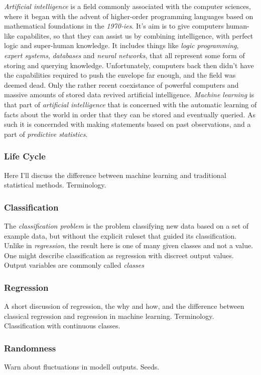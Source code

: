 \documentclass[a4paper,man,12pt,apacite]{apa6} %
\begin{document}
\emph{Artificial intelligence} is a field commonly associated with the
computer sciences, where it began with the advent of higher-order
programming languages based on mathematical foundations in the \emph{1970-ies}.
It's aim is to give computers human-like capabilites, so that they can assist
us by combining intelligence, with perfect logic and super-human knowledge.
It includes things like \emph{logic programming}, \emph{expert systems},
\emph{databases} and \emph{neural networks}, that all represent some form of
storing and querying knowledge.
Unfortunately, computers back then didn't have the capabilities required
to push the envelope far enough, and the field was deemed dead.
Only the rather recent coexistance of powerful computers and massive amounts
of stored data revived artificial intelligence.
\emph{Machine learning} is that part of \emph{artificial intelligence} that
is concerned with the automatic learning of facts about the world in order
that they can be stored and eventually queried.
As such it is concernded with making statements based on past observations,
and a part of \emph{predictive statistics}. 


\subsubsection{Life Cycle}
Here I'll discuss the difference between machine learning and traditional
statistical methods. Terminology.

\subsubsection{Classification}
The \emph{classification problem} is the problem classifying new data based
on a set of example data, but without the explicit ruleset that guided its
classification.
Unlike in \emph{regression}, the result here is one of many given classes
and not a value.
One might describe classification as regression with discreet output values.
Output variables are commonly called \emph{classes}

\subsubsection{Regression}
A short discussion of regression, the why and how, and the difference
between classical regression and regression in machine learning.
Terminology. Classification with continuous classes.

\subsubsection{Randomness}
Warn about fluctuations in modell outputs. Seeds.
\end{document}
